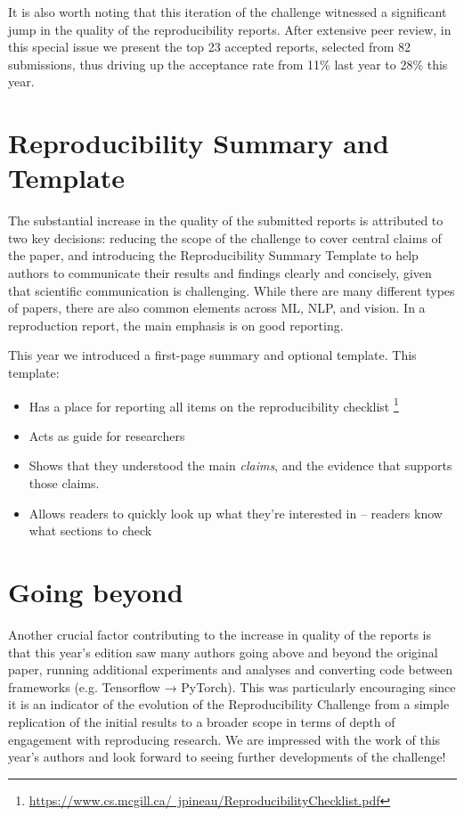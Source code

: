 It is also worth noting that this iteration of the challenge witnessed a significant jump in the quality of the reproducibility reports. After extensive peer review, in this special issue we present the top 23 accepted reports, selected from 82 submissions, thus driving up the acceptance rate from 11\% last year to 28\% this year.


\section{Reproducibility Summary and Template}

The substantial increase in the quality of the submitted reports is attributed to two key decisions: reducing the scope of the challenge to cover central claims of the paper, and introducing the Reproducibility Summary Template to help authors to communicate their results and findings clearly and concisely, given that scientific communication is challenging. While there are many different types of papers, there are also common elements across ML, NLP, and vision. In a reproduction report, the main emphasis is on good reporting.

This year we introduced a first-page summary and optional template. This template:
\begin{itemize}
  \item Has a place for reporting all items on the reproducibility checklist \footnote{\href{https://www.cs.mcgill.ca/~jpineau/ReproducibilityChecklist.pdf}{https://www.cs.mcgill.ca/~jpineau/ReproducibilityChecklist.pdf}}
  \item Acts as guide for researchers
  \item Shows that they understood the main \textit{claims}, and the evidence that supports those claims.
  \item Allows readers to quickly look up what they're interested in -- readers know what sections to check
\end{itemize}

\section{Going beyond}

Another crucial factor contributing to the increase in quality of the reports is that this year’s edition saw many authors going above and beyond the original paper, running additional experiments and analyses and converting code between frameworks (e.g. Tensorflow → PyTorch). This was particularly encouraging since it is an indicator of the evolution of the Reproducibility Challenge from a simple replication of the initial results to a broader scope in terms of depth of engagement with reproducing research. We are impressed with the work of this year’s authors and look forward to seeing further developments of the challenge!


